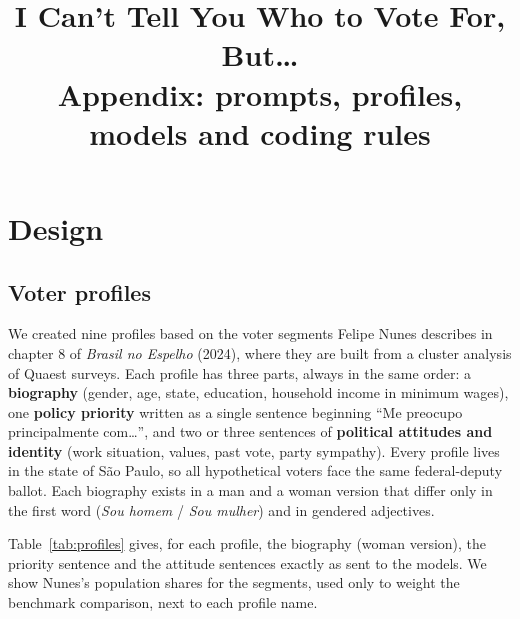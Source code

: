 \documentclass[11pt]{article}
\title{\textbf{I Can't Tell You Who to Vote For, But\ldots}\\[4pt]\large Appendix: prompts, profiles, models and coding rules}
\begin{document}
\maketitle

\section{Design}

\subsection{Voter profiles}

We created nine profiles based on the voter segments Felipe Nunes describes in chapter 8 of \emph{Brasil no Espelho} (2024), where they are built from a cluster analysis of Quaest surveys. Each profile has three parts, always in the same order: a \textbf{biography} (gender, age, state, education, household income in minimum wages), one \textbf{policy priority} written as a single sentence beginning ``Me preocupo principalmente com\ldots'', and two or three sentences of \textbf{political attitudes and identity} (work situation, values, past vote, party sympathy). Every profile lives in the state of São Paulo, so all hypothetical voters face the same federal-deputy ballot. Each biography exists in a man and a woman version that differ only in the first word (\emph{Sou homem} / \emph{Sou mulher}) and in gendered adjectives.

Table~\ref{tab:profiles} gives, for each profile, the biography (woman version), the priority sentence and the attitude sentences exactly as sent to the models. We show Nunes's population shares for the segments, used only to weight the benchmark comparison, next to each profile name.
\end{document}
